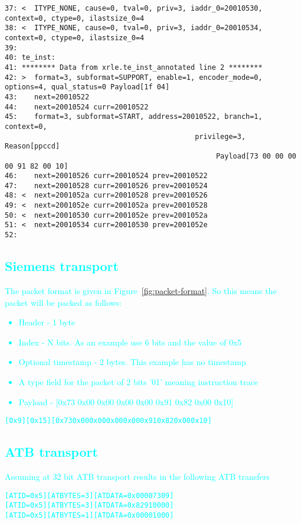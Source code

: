 \begin{lstlisting}[basicstyle=\tiny]
37: <  ITYPE_NONE, cause=0, tval=0, priv=3, iaddr_0=20010530, context=0, ctype=0, ilastsize_0=4
38: <  ITYPE_NONE, cause=0, tval=0, priv=3, iaddr_0=20010534, context=0, ctype=0, ilastsize_0=4
39:
40: te_inst:
41: ******** Data from xrle.te_inst_annotated line 2 ********
42: >  format=3, subformat=SUPPORT, enable=1, encoder_mode=0, options=4, qual_status=0 Payload[1f 04]
43:    next=20010522
44:    next=20010524 curr=20010522
45:    format=3, subformat=START, address=20010522, branch=1, context=0,
                                             privilege=3, Reason[ppccd]
                                                  Payload[73 00 00 00 00 91 82 00 10]
46:    next=20010526 curr=20010524 prev=20010522
47:    next=20010528 curr=20010526 prev=20010524
48: <  next=2001052a curr=20010528 prev=20010526
49: <  next=2001052e curr=2001052a prev=20010528
50: <  next=20010530 curr=2001052e prev=2001052a
51: <  next=20010534 curr=20010530 prev=2001052e
52:
\end{lstlisting}

\textcolor{cyan}{\subsection{Siemens transport}}

\textcolor{cyan}{The packet format is given in Figure~\ref{fig:packet-format}. So this means the packet will be packed as follows:}

\textcolor{cyan}{\begin{itemize}
\item
  Header - 1 byte
\item
  Index - N bits. As an example use 6 bits and the value of 0x5
\item
  Optional timestamp - 2 bytes. This example has no timestamp
\item
A type field for the packet of 2 bits '01' meaning instruction trace  
\item
  Payload - [0x73 0x00 0x00 0x00 0x00 0x91 0x82 0x00 0x10]
\end{itemize}}

\begin {alltt}
\textcolor{cyan}{  [0x9][0x15][0x73 0x00 0x00 0x00 0x00 0x91 0x82 0x00 0x10]}
\end{alltt}
\textcolor{cyan}{\subsection{ATB transport}}

\textcolor{cyan}{Assuming at 32 bit ATB transport results in the following ATB transfers}

\begin {alltt}
\textcolor{cyan}{[ATID=0x5] [ATBYTES = 3] [ATDATA = 0x00007309]
[ATID=0x5] [ATBYTES = 3] [ATDATA = 0x82910000]
[ATID=0x5] [ATBYTES = 1] [ATDATA = 0x00001000]}
\end{alltt}
